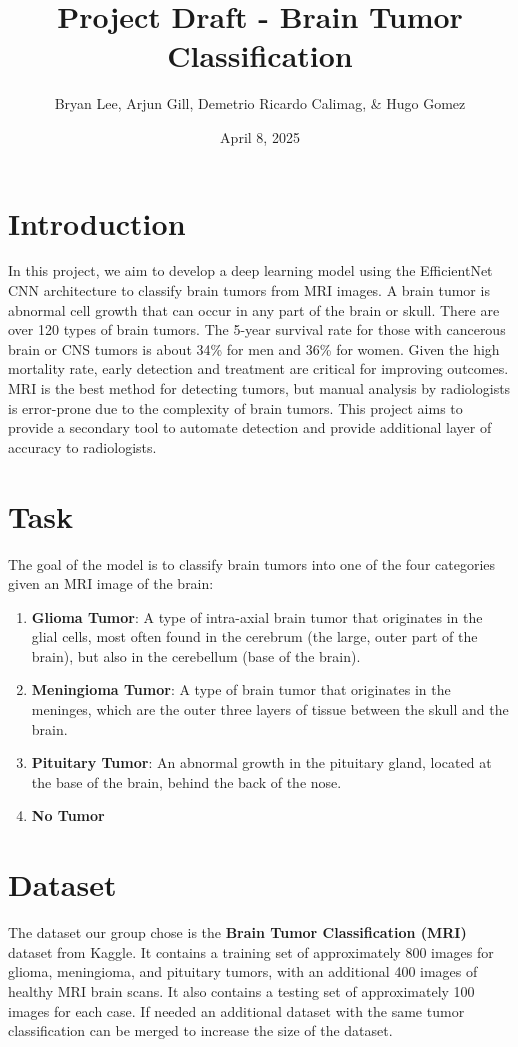\documentclass[11pt]{article}
\title{Project Draft - Brain Tumor Classification}
\author{Bryan Lee, Arjun Gill, Demetrio Ricardo Calimag, \& Hugo Gomez}
\date{April 8, 2025}
\begin{document}
\maketitle
\thispagestyle{fancy}

\section{Introduction}
In this project, we aim to develop a deep learning model using the EfficientNet CNN architecture to classify 
brain tumors from MRI images. A brain tumor is abnormal cell growth that can occur in any 
part of the brain or skull. There are over 120 types of brain tumors. The 5-year survival 
rate for those with cancerous brain or CNS tumors is about 34\% for men and 36\% for women. 
Given the high mortality rate, early detection and treatment are critical for improving outcomes.  
MRI is the best method for detecting tumors, but manual analysis by radiologists is error-prone due to 
the complexity of brain tumors. This project aims to provide a secondary tool to automate detection
and provide additional layer of accuracy to radiologists.

\section{Task}
The goal of the model is to classify brain tumors into one of the four categories given an MRI image of the brain:
\begin{enumerate}
    \item \textbf{Glioma Tumor}: A type of intra-axial brain tumor that originates in the glial cells, most often found in the cerebrum 
    (the large, outer part of the brain), but also in the cerebellum (base of the brain).
    \item \textbf{Meningioma Tumor}: A type of brain tumor that originates in the meninges, 
    which are the outer three layers of tissue between the skull and the brain. 
    \item \textbf{Pituitary Tumor}: An abnormal growth in the pituitary gland, located at the base of the brain, 
    behind the back of the nose.
    \item \textbf{No Tumor}
\end{enumerate}

\section{Dataset}
The dataset our group chose is the \textbf{Brain Tumor Classification (MRI)} dataset from Kaggle.
It contains a training set of approximately 800 images for glioma, meningioma, and pituitary tumors, with an additional 400 images of healthy MRI brain scans.
It also contains a testing set of approximately 100 images for each case.
If needed an additional dataset with the same tumor classification can be merged to increase the size of the dataset. \\
\end{document}
